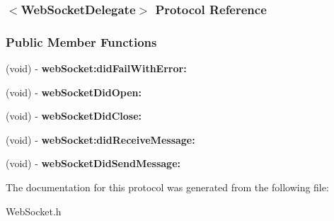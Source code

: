 \hypertarget{protocol_web_socket_delegate-p}{
\subsubsection{$<$WebSocketDelegate$>$ Protocol Reference}
\label{protocol_web_socket_delegate-p}
}
\subsubsection*{Public Member Functions}
\begin{DoxyCompactItemize}
\item 
\hypertarget{protocol_web_socket_delegate-p_a6bda51ec740f148599c3d8252d7ec88a}{
(void) -\/ {\bfseries webSocket:didFailWithError:}}
\label{protocol_web_socket_delegate-p_a6bda51ec740f148599c3d8252d7ec88a}

\item 
\hypertarget{protocol_web_socket_delegate-p_ae8a3309f91ca1ddee18fa14d747e3655}{
(void) -\/ {\bfseries webSocketDidOpen:}}
\label{protocol_web_socket_delegate-p_ae8a3309f91ca1ddee18fa14d747e3655}

\item 
\hypertarget{protocol_web_socket_delegate-p_a9135705eada559f2d3b33ba99280c8fd}{
(void) -\/ {\bfseries webSocketDidClose:}}
\label{protocol_web_socket_delegate-p_a9135705eada559f2d3b33ba99280c8fd}

\item 
\hypertarget{protocol_web_socket_delegate-p_afa69242653412631341649ebfb60b57e}{
(void) -\/ {\bfseries webSocket:didReceiveMessage:}}
\label{protocol_web_socket_delegate-p_afa69242653412631341649ebfb60b57e}

\item 
\hypertarget{protocol_web_socket_delegate-p_a412c894d1024d01b2a943e4f98fd96ab}{
(void) -\/ {\bfseries webSocketDidSendMessage:}}
\label{protocol_web_socket_delegate-p_a412c894d1024d01b2a943e4f98fd96ab}

\end{DoxyCompactItemize}


The documentation for this protocol was generated from the following file:\begin{DoxyCompactItemize}
\item 
WebSocket.h\end{DoxyCompactItemize}
